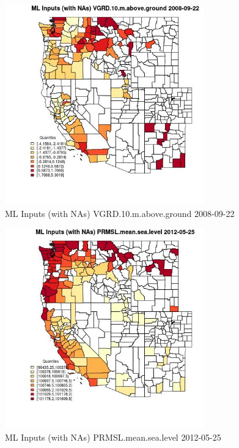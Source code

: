 \begin{figure} 
\centering  
\includegraphics[width=0.77\textwidth]{Code_Outputs/Report_ML_input_PM25_Step4_part_e_de_duplicated_aves_compiled_2019-05-18wNAs_CountyVGRD10mabovegroundMean2008-09-22_2008-09-22.jpg} 
\caption{\label{fig:Report_ML_input_PM25_Step4_part_e_de_duplicated_aves_compiled_2019-05-18wNAsCountyVGRD10mabovegroundMean2008-09-22_2008-09-22}ML Inputs (with NAs) VGRD.10.m.above.ground 2008-09-22} 
\end{figure} 
 

\begin{figure} 
\centering  
\includegraphics[width=0.77\textwidth]{Code_Outputs/Report_ML_input_PM25_Step4_part_e_de_duplicated_aves_compiled_2019-05-18wNAs_CountyPRMSLmeansealevelMean2012-05-25_2012-05-25.jpg} 
\caption{\label{fig:Report_ML_input_PM25_Step4_part_e_de_duplicated_aves_compiled_2019-05-18wNAsCountyPRMSLmeansealevelMean2012-05-25_2012-05-25}ML Inputs (with NAs) PRMSL.mean.sea.level 2012-05-25} 
\end{figure} 
 

